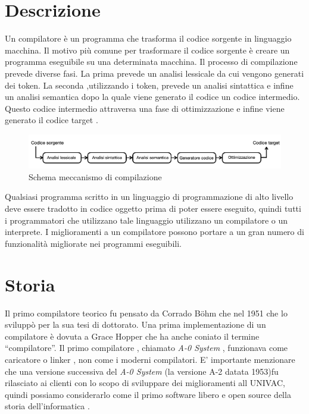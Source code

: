 \documentclass[12pt,a4paper]{report}
\begin{document}
\section{Descrizione}
Un compilatore è un programma che trasforma il codice sorgente in linguaggio macchina. Il motivo più comune per trasformare il codice sorgente è creare un programma eseguibile su una determinata macchina. Il processo di compilazione prevede diverse fasi. La prima prevede un analisi lessicale da cui vengono generati dei token. La seconda ,utilizzando i token, prevede un analisi sintattica e infine un analisi semantica dopo la quale viene generato il codice un codice intermedio. Questo codice intermedio attraversa una fase di ottimizzazione e infine viene generato il codice target \cite{GCC} \cite{LLVM}.


\begin{figure}
\centering
\includegraphics[width = \textwidth]{SchemaCompilatore.png}
\caption{Schema meccanismo di compilazione}
\label{Fig:MeccanismoCompilazione}
\end{figure} %

Qualsiasi programma scritto in un linguaggio di programmazione di alto livello deve essere tradotto in codice oggetto prima di poter essere eseguito, quindi tutti i programmatori che utilizzano tale linguaggio utilizzano un compilatore o un interprete. I miglioramenti a un compilatore possono portare a un gran numero di funzionalità migliorate nei programmi eseguibili.

\section{Storia}
Il primo compilatore teorico fu pensato da Corrado Böhm che nel 1951 che lo sviluppò per la sua tesi di dottorato.  Una  prima implementazione di un compilatore è dovuta a Grace Hopper  che ha anche coniato il termine ``compilatore''.  Il primo compilatore , chiamato \textit{A-0 System} ,  funzionava come caricatore o linker , non come i moderni compilatori. E' importante menzionare che una versione successiva del \textit{A-0 System} (la versione A-2 datata 1953)fu rilasciato ai clienti con lo scopo di sviluppare dei miglioramenti all UNIVAC, quindi possiamo considerarlo come il primo software libero e open source della storia dell'informatica \cite{SystemA0}
\cite{openSource1}
\cite{openOrg}
\cite{stallman2003software}.
\end{document}
